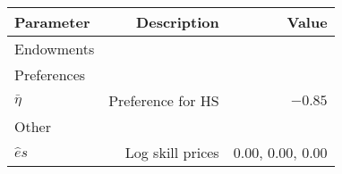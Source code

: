 \begin{tabular}{lrr}
\hline
Parameter & Description  & Value  \\ 
\hline
Endowments &   &   \\ 
Preferences &   &   \\ 
$\bar{\eta}$ & Preference for HS  & $-0.85$  \\ 
Other &   &   \\ 
$\hat{e}{s}$ & Log skill prices  & 0.00, 0.00, 0.00  \\ 
\hline
\end{tabular}%
